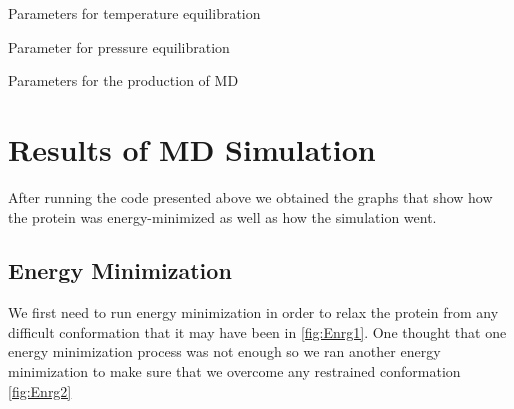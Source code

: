 \documentclass{article}
\begin{document}
 Parameters for temperature equilibration
 
 
 Parameter for pressure equilibration
 
 
 Parameters for the production of MD
 
 
 \section{Results of MD Simulation}
 After running the code presented above we obtained the graphs that show how the protein was energy-minimized as well as how the simulation went.
 \subsection{Energy Minimization}
 We first need to run energy minimization in order to relax the protein from any difficult conformation that it may have been in \cref{fig:Enrg1}. One thought that one energy minimization process was not enough so we ran another energy minimization to make sure that we overcome any restrained conformation \cref{fig:Enrg2}
\end{document}

